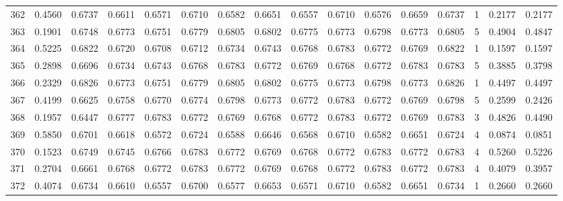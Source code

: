 \begin{tabular}{lrrrrrrrrrrrrrrr}
362 &      0.4560 &  0.6737 &  0.6611 &  0.6571 &  0.6710 &  0.6582 &  0.6651 &  0.6557 &  0.6710 &  0.6576 &   0.6659 &     0.6737 &      1 &                    0.2177 &                     0.2177 \\
363 &      0.1901 &  0.6748 &  0.6773 &  0.6751 &  0.6779 &  0.6805 &  0.6802 &  0.6775 &  0.6773 &  0.6798 &   0.6773 &     0.6805 &      5 &                    0.4904 &                     0.4847 \\
364 &      0.5225 &  0.6822 &  0.6720 &  0.6708 &  0.6712 &  0.6734 &  0.6743 &  0.6768 &  0.6783 &  0.6772 &   0.6769 &     0.6822 &      1 &                    0.1597 &                     0.1597 \\
365 &      0.2898 &  0.6696 &  0.6734 &  0.6743 &  0.6768 &  0.6783 &  0.6772 &  0.6769 &  0.6768 &  0.6772 &   0.6783 &     0.6783 &      5 &                    0.3885 &                     0.3798 \\
366 &      0.2329 &  0.6826 &  0.6773 &  0.6751 &  0.6779 &  0.6805 &  0.6802 &  0.6775 &  0.6773 &  0.6798 &   0.6773 &     0.6826 &      1 &                    0.4497 &                     0.4497 \\
367 &      0.4199 &  0.6625 &  0.6758 &  0.6770 &  0.6774 &  0.6798 &  0.6773 &  0.6772 &  0.6783 &  0.6772 &   0.6769 &     0.6798 &      5 &                    0.2599 &                     0.2426 \\
368 &      0.1957 &  0.6447 &  0.6777 &  0.6783 &  0.6772 &  0.6769 &  0.6768 &  0.6772 &  0.6783 &  0.6772 &   0.6769 &     0.6783 &      3 &                    0.4826 &                     0.4490 \\
369 &      0.5850 &  0.6701 &  0.6618 &  0.6572 &  0.6724 &  0.6588 &  0.6646 &  0.6568 &  0.6710 &  0.6582 &   0.6651 &     0.6724 &      4 &                    0.0874 &                     0.0851 \\
370 &      0.1523 &  0.6749 &  0.6745 &  0.6766 &  0.6783 &  0.6772 &  0.6769 &  0.6768 &  0.6772 &  0.6783 &   0.6772 &     0.6783 &      4 &                    0.5260 &                     0.5226 \\
371 &      0.2704 &  0.6661 &  0.6768 &  0.6772 &  0.6783 &  0.6772 &  0.6769 &  0.6768 &  0.6772 &  0.6783 &   0.6772 &     0.6783 &      4 &                    0.4079 &                     0.3957 \\
372 &      0.4074 &  0.6734 &  0.6610 &  0.6557 &  0.6700 &  0.6577 &  0.6653 &  0.6571 &  0.6710 &  0.6582 &   0.6651 &     0.6734 &      1 &                    0.2660 &                     0.2660 \\

\end{tabular}
